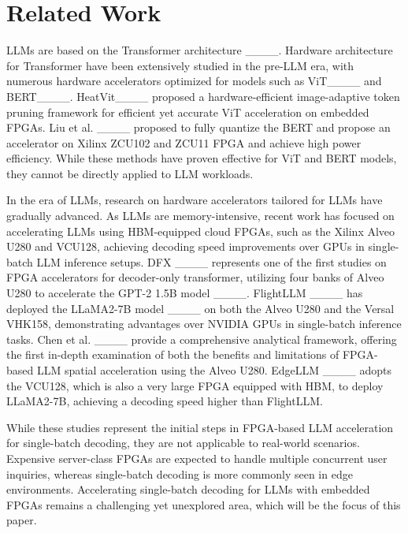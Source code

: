 \section{Related Work}
LLMs are based on the Transformer architecture ____. 
Hardware architecture for Transformer have been extensively studied in the pre-LLM era, with numerous hardware accelerators optimized for models such as ViT____ and BERT____.
HeatVit____ proposed a hardware-efficient image-adaptive token pruning framework for efficient yet accurate ViT acceleration on embedded FPGAs. Liu et al. ____ proposed to fully quantize the BERT and propose an accelerator on Xilinx ZCU102 and ZCU11 FPGA and achieve high power efficiency.
While these methods have proven effective for ViT and BERT models, they cannot be directly applied to LLM workloads.

In the era of LLMs, research on hardware accelerators tailored for LLMs have gradually advanced.
As LLMs are memory-intensive, recent work has focused on accelerating LLMs using HBM-equipped cloud FPGAs, such as the Xilinx Alveo U280 and VCU128, achieving decoding speed improvements over GPUs in single-batch LLM inference setups.
DFX ____ represents one of the first studies on FPGA accelerators for decoder-only transformer, utilizing four banks of Alveo U280 to accelerate the GPT-2 1.5B model ____. FlightLLM ____ has deployed the LLaMA2-7B model ____ on both the Alveo U280 and the Versal VHK158, demonstrating advantages over NVIDIA GPUs in single-batch inference tasks. Chen et al. ____ provide a comprehensive analytical framework, offering the first in-depth examination of both the benefits and limitations of FPGA-based LLM spatial acceleration using the Alveo U280. EdgeLLM ____ adopts the VCU128, which is also a very large FPGA equipped with HBM, to deploy LLaMA2-7B, achieving a decoding speed higher than FlightLLM.

While these studies represent the initial steps in FPGA-based LLM acceleration for single-batch decoding, they are not applicable to real-world scenarios. Expensive server-class FPGAs are expected to handle multiple concurrent user inquiries, whereas single-batch decoding is more commonly seen in edge environments.
Accelerating single-batch decoding for LLMs with embedded FPGAs remains a challenging yet unexplored area, which will be the focus of this paper.